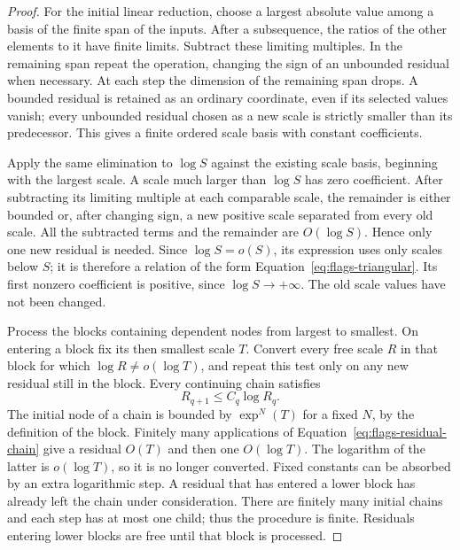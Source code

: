 \begin{proof}
For the initial linear reduction, choose a largest absolute value
among a basis of the finite span of the inputs. After a subsequence,
the ratios of the other elements to it have finite limits. Subtract
these limiting multiples. In the remaining span repeat the operation,
changing the sign of an unbounded residual when necessary. At each
step the dimension of the remaining span drops. A bounded residual is
retained as an ordinary coordinate, even if its selected values vanish; every unbounded residual chosen as a new scale
is strictly smaller than its predecessor. This gives a finite ordered
scale basis with constant coefficients.

Apply the same elimination to $\log S$ against the existing scale
basis, beginning with the largest scale. A scale much larger than
$\log S$ has zero coefficient. After subtracting its limiting multiple
at each comparable scale, the remainder is either bounded or, after
changing sign, a new positive scale separated from every old scale.
All the subtracted terms and the remainder are $O(\log S)$. Hence only
one new residual is needed. Since $\log S=o(S)$, its expression uses
only scales below $S$; it is therefore a relation of the form
Equation~\eqref{eq:flags-triangular}. Its first nonzero coefficient is
positive, since $\log S\to+\infty$. The old scale values have not been
changed.

Process the blocks containing dependent nodes from largest to
smallest. On entering a block fix its then smallest scale $T$.
Convert every free scale $R$ in that block for which
$\log R\ne o(\log T)$, and repeat this test only on any new residual
still in the block. Every continuing chain satisfies
\begin{equation}\label{eq:flags-residual-chain}
 R_{q+1}\le C_q\log R_q.
\end{equation}
The initial node of a chain is bounded by $\exp^{N}(T)$ for a fixed
$N$, by the definition of the block. Finitely many applications of
Equation~\eqref{eq:flags-residual-chain} give a residual $O(T)$ and
then one $O(\log T)$. The logarithm of the latter is
$o(\log T)$, so it is no longer converted. Fixed constants can be
absorbed by an extra logarithmic step. A residual that has entered a
lower block has already left the chain under consideration. There are
finitely many initial chains and each step has at most one child;
thus the procedure is finite. Residuals entering lower blocks are
free until that block is processed.


\end{proof}
